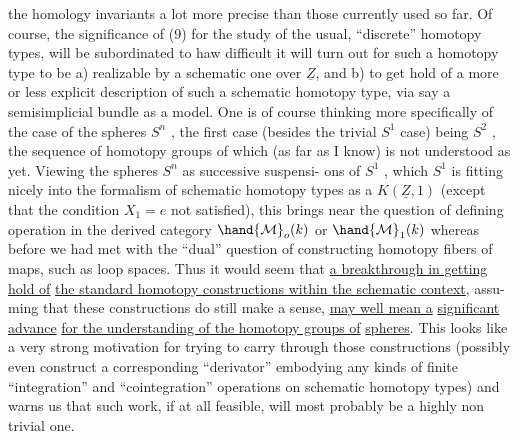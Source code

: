 
the homology invariants a lot more precise than those currently used so
far.  Of course,  the significance of (9) for the study of the usual,
``discrete'' homotopy types,  will be subordinated to haw difficult it will
turn out for such a homotopy type to be  a) realizable by a schematic
one over $\underline{Z}$,  and  b) to get hold of a more or less explicit
description of  such a schematic homotopy type,  via say a semisimplicial
bundle as a model.  One is of course thinking more specifically of the
case of the spheres $S^n$ ,  the first case (besides the trivial $S^1$ case)
being $S^2$ ,  the sequence of homotopy groups of which (as far as I know)
is not understood as yet.  Viewing the spheres $S^n$ as successive suspensi-%
ons of $S^1$ ,  which $S^1$ is fitting nicely into the formalism of schematic
homotopy types as a $K(\underline{Z},1)$  (except that the  condition $X_1=e$   not 
satisfied),  this brings near the question of defining   operation
in the  derived category $\hand{\mathcal{M}}_o(k)$ or $\hand{\mathcal{M}}_1(k)$\unsure{,} \hand{(}whereas before we had met with
the ``dual'' question of constructing homotopy fibers of maps,  such as
loop spaces\hand{)}.  Thus it would seem that \uline{a breakthrough in getting hold of}
\uline{the standard homotopy constructions within the schematic context},  assu-%
ming that these constructions do still make a sense,  \uline{may well mean a}
\uline{significant advance}  \uline{for the understanding of the homotopy groups of}
\uline{spheres}.  This  looks like a very strong motivation for
trying to  carry through those constructions (possibly even
construct a corresponding ``derivator'' embodying any kinds of finite
``integration'' and ``cointegration'' operations on schematic homotopy types)\hand{,}
and  warns us that such work,  if at all feasible,  will most probably be
a highly non trivial one.


